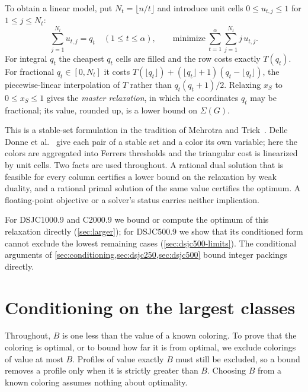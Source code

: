 \documentclass[11pt]{article}
\theoremstyle{definition}
\newcommand{\DSJCFiveHundred}{\textnormal{\textsc{DSJC500.9}}}
\newcommand{\DSJCThousand}{\textnormal{\textsc{DSJC1000.9}}}
\newcommand{\CTwoThousand}{\textnormal{\textsc{C2000.9}}}
\begin{document}
To obtain a linear model, put $N_t=\lfloor n/t\rfloor$ and introduce unit
cells $0\le u_{t,j}\le1$ for $1\le j\le N_t$:
\begin{equation}
  \sum_{j=1}^{N_t}u_{t,j}=q_t\quad(1\le t\le\alpha),\qquad
  \text{minimize}\ \sum_{t=1}^{\alpha}\sum_{j=1}^{N_t}j\,u_{t,j}.
  \label{eq:unit-cell-master}
\end{equation}
For integral $q_t$ the cheapest $q_t$ cells are filled and the row costs
exactly $T(q_t)$. For fractional $q_t\in[0,N_t]$ it costs
$T(\lfloor q_t\rfloor)+(\lfloor q_t\rfloor+1)(q_t-\lfloor q_t\rfloor)$, the
piecewise-linear interpolation of $T$ rather than $q_t(q_t+1)/2$. Relaxing
$x_S$ to $0\le x_S\le1$ gives the \emph{master relaxation}, in which the
coordinates $q_t$ may be fractional; its value, rounded up, is a lower bound
on $\Sigma(G)$.

This is a stable-set formulation in the tradition of Mehrotra and
Trick~\cite{mehrotra1996}. Delle Donne et al.~\cite{delledonne2021} give each
pair of a stable set and a color its own variable; here the colors are
aggregated into Ferrers thresholds and the triangular cost is linearized by
unit cells. Two facts are used throughout. A rational dual solution that is
feasible for every column certifies a lower bound on the relaxation by weak
duality, and a rational primal solution of the same value certifies the
optimum. A floating-point objective or a solver's status carries neither
implication.

For \DSJCThousand{} and \CTwoThousand{} we bound or compute the optimum of
this relaxation directly (\cref{sec:larger}); for \DSJCFiveHundred{} we show
that its conditioned form cannot exclude the lowest remaining cases
(\cref{sec:dsjc500-limits}). The conditional arguments of
\cref{sec:conditioning,sec:dsjc250,sec:dsjc500} bound integer packings
directly.

\section{Conditioning on the largest classes}
\label{sec:conditioning}

Throughout, $B$ is one less than the value of a known coloring. To prove that
the coloring is optimal, or to bound how far it is from optimal, we exclude
colorings of value at most $B$. Profiles of value exactly $B$ must still be
excluded, so a bound removes a profile only when it is strictly greater than
$B$. Choosing $B$ from a known coloring assumes nothing about optimality.
\end{document}
